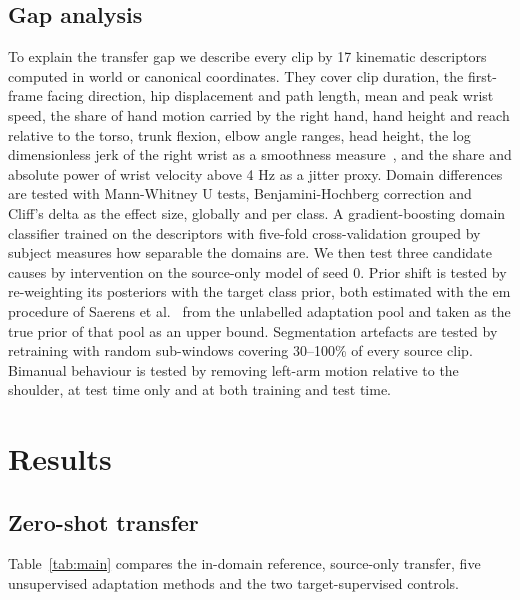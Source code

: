 \documentclass[3p,times,procedia]{elsarticle}
\begin{document}
\subsection{Gap analysis}

To explain the transfer gap we describe every clip by 17 kinematic descriptors
computed in world or canonical coordinates. They cover clip duration, the
first-frame facing direction, hip displacement and path length, mean and peak
wrist speed, the share of hand motion carried by the right hand, hand height
and reach relative to the torso, trunk flexion, elbow angle ranges, head
height, the log dimensionless jerk of the right wrist as a smoothness
measure~\cite{balasubramanian2015smoothness}, and the share and absolute power
of wrist velocity above 4 Hz as a jitter proxy. Domain differences are tested
with Mann-Whitney U tests, Benjamini-Hochberg correction and Cliff's delta as
the effect size, globally and per class. A gradient-boosting domain classifier
trained on the descriptors with five-fold cross-validation grouped by subject
measures how separable the domains are. We then test three candidate causes by
intervention on the source-only model of seed 0. Prior shift is tested by
re-weighting its posteriors with the target class prior, both estimated with
the \ac{em} procedure of Saerens et al.~\cite{saerens2002priors} from the
unlabelled adaptation pool and taken as the true prior of that pool as an upper
bound. Segmentation artefacts are tested by retraining with random sub-windows
covering 30--100\% of every source clip. Bimanual behaviour is tested by
removing left-arm motion relative to the shoulder, at test time only and at
both training and test time.

\section{Results}
\label{sec:results}

\subsection{Zero-shot transfer}

Table~\ref{tab:main} compares the in-domain reference, source-only transfer,
five unsupervised adaptation methods and the two target-supervised controls.
\end{document}
